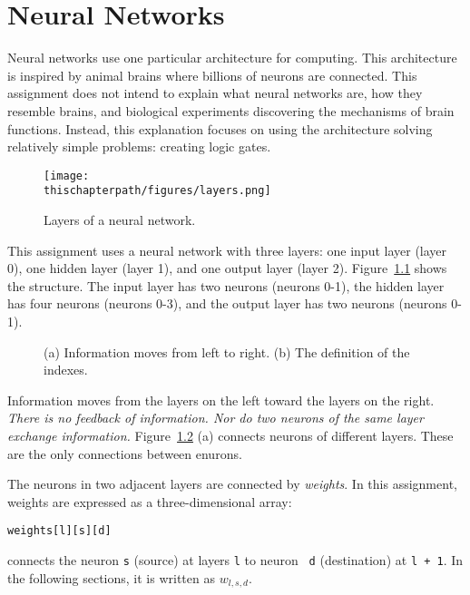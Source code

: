 \chapter{Neural Networks}
\label{chapter:nn}

Neural networks use one particular architecture for computing.  This
architecture is inspired by animal brains where billions of neurons are connected.
This assignment does not intend to explain what neural networks are,
how they resemble brains, and biological experiments discovering the
mechanisms of brain functions.  Instead, this explanation focuses on
using the architecture solving relatively simple problems: creating
logic gates.

\begin{figure}[h]
\centering
{\texttt{[image: \\thischapterpath/figures/layers.png]}}
\caption{Layers of a neural network.}
  \label{fig:layers}
\end{figure}

This assignment uses a neural network with three layers: one input
layer (layer 0), one hidden layer (layer 1), and one output layer
(layer 2).  Figure~\ref{fig:layers} shows the structure.  The input
layer has two neurons (neurons 0-1), the hidden layer has four neurons
(neurons 0-3), and the output layer has two neurons (neurons 0-1).

\begin{figure}[h]
\centering
{}
\hspace{0.3in}
\caption{(a) Information moves from left to right.
(b) The definition of the indexes.}
  \label{fig:forward}
\end{figure}

Information moves from the layers on the left toward the layers on the
right.  {\it There is no feedback of information.  Nor do two neurons
of the same layer exchange information.  } Figure~\ref{fig:forward}
(a) connects neurons of different layers.  These are the only
connections between enurons.

The neurons in two adjacent layers are connected by {\it weights}.  In
this assignment, weights are expressed as a three-dimensional array:

\begin{verbatim}
weights[l][s][d]
\end{verbatim}

connects the neuron {\tt s} (source) at layers {\tt l} to neuron {\tt
d} (destination) at {\tt l + 1}.  In the following sections, it is
written as $w_{l, s, d}$.

